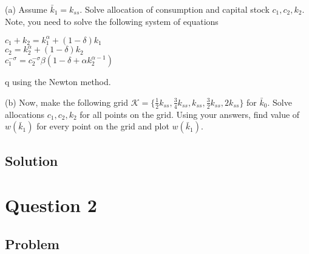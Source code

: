 \documentclass[10pt, a4paper]{article}
\begin{document}
    (a) Assume $\bar k_1=k_{ss}$. Solve allocation of consumption and capital stock $c_1, c_2, k_2$. Note, you need to solve the following system of equations 
    \begin{center}
      $c_1+k_2=k_1^{\alpha}+(1-\delta)k_1$ \\ 
      $c_2=k_2^{\alpha}+(1-\delta)k_2$ \\
      $c_1^{-\sigma}=c_2^{-\sigma}\beta(1-\delta+\alpha k_2^{\alpha-1})$ \\
    \end{center}
q   using the Newton method.

    (b) Now, make the following grid $\mathcal{K}=\{\frac{1}{2} k_{ss}, \frac{3}{4}k_{ss}, k_{ss}, \frac{3}{2}k_{ss}, 2k_{ss}\}$ for $\bar k_0$. Solve allocations $c_1, c_2, k_2$ for all points on the grid. Using your answers, find value of $w(\bar k_1)$ for every point on the grid and plot $w(\bar k_1)$.
  \subsection{Solution}
\section{Question 2}
  \subsection{Problem}
    
\end{document}
